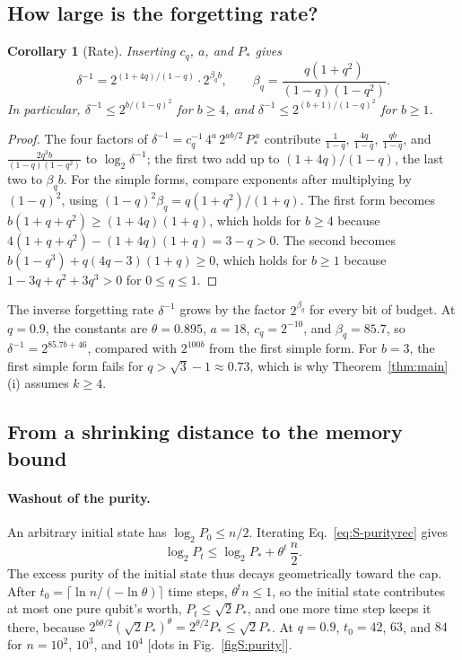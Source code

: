 \documentclass[aps,prl,twocolumn,superscriptaddress,floatfix]{revtex4-2}
\theoremstyle{plain}
\newtheorem{corollary}[lemma]{Corollary}
\begin{document}
\subsection{How large is the forgetting rate?}
\label{sm:rate}

\begin{corollary}[Rate]\label{cor:rate}
Inserting $c_q$, $a$, and $P_*$ gives
\begin{equation}
\delta^{-1}=2^{(1+4q)/(1-q)}\cdot2^{\beta_qb},\qquad\beta_q=\frac{q(1+q^2)}{(1-q)(1-q^2)} .
\label{eq:S-rate}
\end{equation}
In particular, $\delta^{-1}\le2^{b/(1-q)^2}$ for $b\ge4$, and $\delta^{-1}\le2^{(b+1)/(1-q)^2}$ for $b\ge1$.
\end{corollary}

\begin{proof}
The four factors of $\delta^{-1}=c_q^{-1}\,4^{a}\,2^{ab/2}\,P_*^{\,a}$ contribute $\frac1{1-q}$, $\frac{4q}{1-q}$, $\frac{qb}{1-q}$, and $\frac{2q^3b}{(1-q)(1-q^2)}$ to $\log_2\delta^{-1}$; the first two add up to $(1+4q)/(1-q)$, the last two to $\beta_qb$. For the simple forms, compare exponents after multiplying by $(1-q)^2$, using $(1-q)^2\beta_q=q(1+q^2)/(1+q)$. The first form becomes $b(1+q+q^2)\ge(1+4q)(1+q)$, which holds for $b\ge4$ because $4(1+q+q^2)-(1+4q)(1+q)=3-q>0$. The second becomes $b(1-q^3)+q(4q-3)(1+q)\ge0$, which holds for $b\ge1$ because $1-3q+q^2+3q^3>0$ for $0\le q\le1$.
\end{proof}

The inverse forgetting rate $\delta^{-1}$ grows by the factor $2^{\beta_q}$ for every bit of budget. At $q=0.9$, the constants are $\theta=0.895$, $a=18$, $c_q=2^{-10}$, and $\beta_q=85.7$, so $\delta^{-1}=2^{85.7b+46}$, compared with $2^{100b}$ from the first simple form. For $b=3$, the first simple form fails for $q>\sqrt3-1\approx0.73$, which is why Theorem~\ref{thm:main}(i) assumes $k\ge4$.

\subsection{From a shrinking distance to the memory bound}
\label{sm:memory}

\paragraph*{Washout of the purity.} An arbitrary initial state has $\log_2P_0\le n/2$. Iterating Eq.~\eqref{eq:S-purityrec} gives
\begin{equation}
\log_2P_t\le\log_2P_*+\theta^t\,\frac n2 .
\label{eq:S-washout}
\end{equation}
The excess purity of the initial state thus decays geometrically toward the cap. After $t_0=\lceil\ln n/(-\ln\theta)\rceil$ time steps, $\theta^tn\le1$, so the initial state contributes at most one pure qubit's worth, $P_t\le\sqrt2P_*$, and one more time step keeps it there, because $2^{b\theta/2}(\sqrt2P_*)^\theta=2^{\theta/2}P_*\le\sqrt2P_*$. At $q=0.9$, $t_0=42$, $63$, and $84$ for $n=10^2$, $10^3$, and $10^4$ [dots in Fig.~\ref{figS:purity}].
\end{document}

